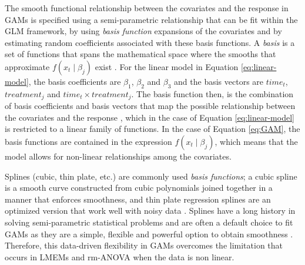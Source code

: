 \documentclass[Royal,times,doublespace,sagev]{sagej}
\begin{document}
The smooth functional relationship between the covariates and the response in GAMs is specified using a semi-parametric relationship that can be fit within the GLM framework, by using \emph{basis function} expansions of the covariates and by estimating random coefficients associated with these basis functions. A \emph{basis} is a set of functions that spans the mathematical space where the smooths that approximate \(f(x_t\mid \beta_j)\) exist \cite{simpson2018}. For the linear model in Equation \eqref{eq:linear-model}, the basis coefficients are \(\beta_1\), \(\beta_2\) and \(\beta_3\) and the basis vectors are \(time_t\), \(treatment_j\) and \(time_t \times treatment_j\). The basis function then, is the combination of basis coefficients and basis vectors that map the possible relationship between the covariates and the response \cite{hefley2017}, which in the case of Equation \eqref{eq:linear-model} is restricted to a linear family of functions. In the case of Equation \eqref{eq:GAM}, the basis functions are contained in the expression \(f(x_t\mid \beta_j)\), which means that the model allows for non-linear relationships among the covariates.

Splines (cubic, thin plate, etc.) are commonly used \emph{basis functions}; a cubic spline is a smooth curve constructed from cubic polynomials joined together in a manner that enforces smoothness, and thin plate regression splines are an optimized version that work well with noisy data \cite{wood2017, simpson2018}. Splines have a long history in solving semi-parametric statistical problems and are often a default choice to fit GAMs as they are a simple, flexible and powerful option to obtain smoothness \cite{wegman1983}. Therefore, this data-driven flexibility in GAMs overcomes the limitation that occurs in LMEMs and rm-ANOVA when the data is non linear.
\end{document}
